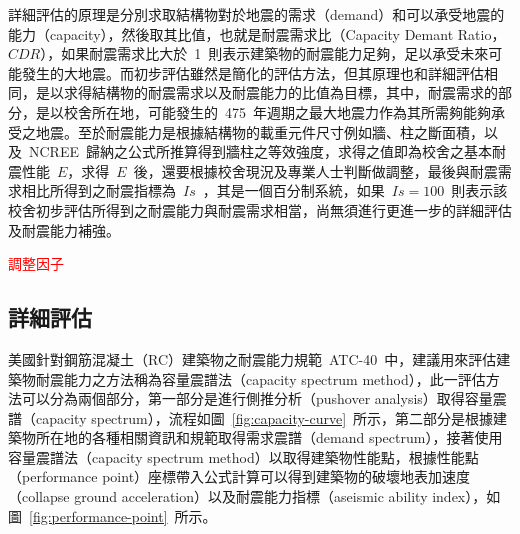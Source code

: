 詳細評估的原理是分別求取結構物對於地震的需求（demand）和可以承受地震的能力（capacity），然後取其比值，也就是耐震需求比（Capacity Demant Ratio，$CDR$），如果耐震需求比大於~1~則表示建築物的耐震能力足夠，足以承受未來可能發生的大地震。而初步評估雖然是簡化的評估方法，但其原理也和詳細評估相同，是以求得結構物的耐震需求以及耐震能力的比值為目標，其中，耐震需求的部分，是以校舍所在地，可能發生的~475~年週期之最大地震力作為其所需夠能夠承受之地震。至於耐震能力是根據結構物的載重元件尺寸例如牆、柱之斷面積，以及~NCREE~歸納之公式所推算得到牆柱之等效強度，求得之值即為校舍之基本耐震性能~$E$，求得~$E$~後，還要根據校舍現況及專業人士判斷做調整，最後與耐震需求相比所得到之耐震指標為~$Is$~，其是一個百分制系統，如果~$Is = 100$~則表示該校舍初步評估所得到之耐震能力與耐震需求相當，尚無須進行更進一步的詳細評估及耐震能力補強。


\textcolor{red}{調整因子}



\subsection{詳細評估}

美國針對鋼筋混凝土（RC）建築物之耐震能力規範~ATC-40\cite{applied1996seismic}~中，建議用來評估建築物耐震能力之方法稱為容量震譜法（capacity spectrum method），此一評估方法可以分為兩個部分，第一部分是進行側推分析（pushover analysis）取得容量震譜（capacity spectrum），流程如圖~\ref{fig:capacity-curve}~所示，第二部分是根據建築物所在地的各種相關資訊和規範取得需求震譜（demand spectrum），接著使用容量震譜法（capacity spectrum method）以取得建築物性能點，根據性能點（performance point）座標帶入公式計算可以得到建築物的破壞地表加速度（collapse ground acceleration）以及耐震能力指標（aseismic ability index），如圖~\ref{fig:performance-point}~所示。

